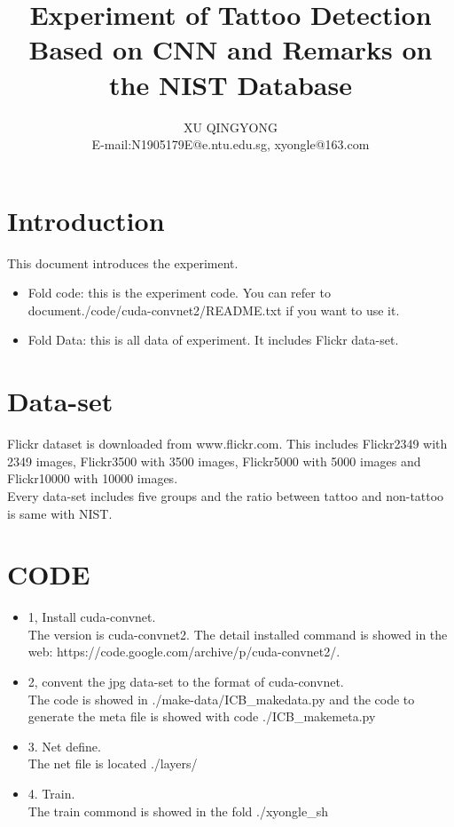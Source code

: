 \documentclass[a4paper]{article}
\title{Experiment of Tattoo Detection Based on CNN and Remarks on the NIST Database}
\author{XU QINGYONG\\E-mail:N1905179E@e.ntu.edu.sg, xyongle@163.com}
\begin{document}
		
		
		\pagestyle{fancy} 
		 
		\setcounter{page}{1}
		\thispagestyle{empty}
		\maketitle
		
%		
		
\section{Introduction}
	This document introduces the experiment.
	 
	\begin{itemize}
		\item Fold code: this is the experiment code. You can refer to document./code/cuda-convnet2/README.txt if you want to use it.
		\item Fold Data: this is all data of experiment. It includes Flickr data-set.
	\end{itemize}
\section{Data-set}
	Flickr dataset is downloaded from www.flickr.com.
	 This includes Flickr2349 with 2349 images, Flickr3500 with 3500 images, Flickr5000  with 5000 images and Flickr10000 with 10000 images.\\
	 Every data-set includes five groups and the ratio between tattoo and non-tattoo is same with NIST.
	

	
\section{CODE}
	
	\begin{itemize}
		\item 1, Install cuda-convnet. \\
		The version is cuda-convnet2. The detail installed command is showed in the web:
		https://code.google.com/archive/p/cuda-convnet2/.
		\item 2, convent the jpg data-set to the format of cuda-convnet. \\
		The code is showed in ./make-data/ICB\_makedata.py and the code to generate the meta 
		file is showed with code ./ICB\_makemeta.py
		\item 3. Net define. \\  The net file is located ./layers/
		\item 4. Train. \\ The train commond is showed in the fold ./xyongle\_sh
		
	\end{itemize}

	
	



\newpage
\begin{thebibliography}{999}
	
\end{thebibliography}
\end{document}
